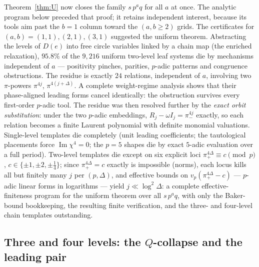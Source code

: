 \documentclass[11pt]{article}
\theoremstyle{remark}
\DeclareMathOperator{\im}{Im}
\begin{document}
Theorem~\ref{thm:U} now closes the family $s\,p^aq$ for all $a$ at once.
The analytic program below preceded that proof; it retains independent
interest, because its tools aim past the $b=1$ column toward the
$(a,b\ge2)$ grids.  The certificates for $(a,b)=(1,1),(2,1),(3,1)$
suggested the uniform theorem.  Abstracting the levels of $D(e)$ into free circle variables
linked by a chain map (the enriched relaxation), $95.8\%$ of the $9{,}216$
uniform two-level leaf systems die by mechanisms independent of $a$ ---
positivity pinches, parities, $p$-adic patterns and congruence obstructions.
The residue is exactly $24$ relations, independent of $a$, involving two
$\pi$-powers $\pi^{4j}$, $\pi^{4(j+\Delta)}$.  A complete weight-regime
analysis shows that their phase-aligned leading forms cancel identically:
the obstruction survives every first-order $p$-adic tool.  The residue was then resolved further by the \emph{exact orbit
substitution}: under the two $p$-adic embeddings, $R_j-\omega I_j=\pi_-^{4j}$
exactly, so each relation becomes a finite Laurent polynomial with definite
monomial valuations.  Single-level templates die completely (unit leading
coefficients; the tautological placements force $\im\chi^4=0$; the $p=5$
shapes die by exact $5$-adic evaluation over a full period).  Two-level
templates die except on six explicit loci
$\pi_+^{4\Delta}\equiv c \pmod p$, $c\in\{\pm1,\pm2,\pm\tfrac14\}$; since
$\pi_+^{4\Delta}=c$ exactly is impossible (norms), each locus kills all but
finitely many $j$ per $(p,\Delta)$, and effective bounds on
$v_p(\pi_+^{4\Delta}-c)$ --- $p$-adic linear forms in logarithms --- yield
$j\ll\log^2\Delta$: a complete effective-finiteness program for the uniform
theorem over all $s\,p^aq$, with only the Baker-bound bookkeeping, the
resulting finite verification, and the three- and four-level chain templates
outstanding.

\subsection*{Three and four levels: the $Q$-collapse and the leading pair}
\end{document}
